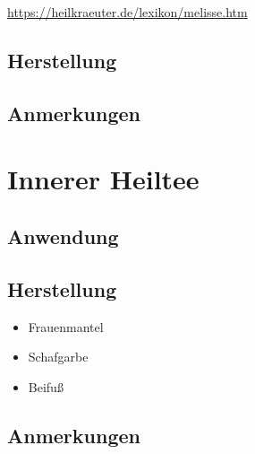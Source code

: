 \cite{heilkraeuterlexikon}  

\url{https://heilkraeuter.de/lexikon/melisse.htm}

\subsection{Herstellung}

\subsection{Anmerkungen}





\section{Innerer Heiltee}

\subsection{Anwendung}

\subsection{Herstellung}

\begin{itemize}
	\item Frauenmantel 
	\item Schafgarbe
	\item Beifuß
\end{itemize}

\subsection{Anmerkungen}

